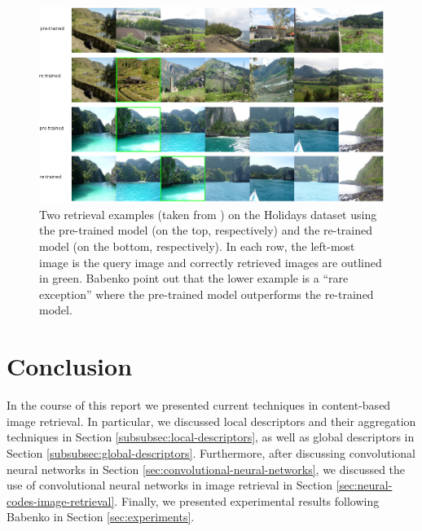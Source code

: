 \begin{figure}
    \centering
    \includegraphics[scale=0.4]{pictures/qualitative-annotated}
    \caption{Two retrieval examples (taken from \cite{BabenkoSlesarevChigorinLempitsky:2014}) on the Holidays dataset using the pre-trained model (on the top, respectively) and the re-trained model (on the bottom, respectively). In each row, the left-most image is the query image and correctly retrieved images are outlined in green. Babenko \etal point out that the lower example is a ``rare exception'' \cite[p. 10]{BabenkoSlesarevChigorinLempitsky:2014} where the pre-trained model outperforms the re-trained model.}
    \label{fig:qualitative}
\end{figure}

\section{Conclusion}
\label{sec:conclusion}

In the course of this report we presented current techniques in content-based image retrieval. In particular, we discussed local descriptors and their aggregation techniques in Section \ref{subsubsec:local-descriptors}, as well as global descriptors in Section \ref{subsubsec:global-descriptors}. Furthermore, after discussing convolutional neural networks in Section \ref{sec:convolutional-neural-networks}, we discussed the use of convolutional neural networks in image retrieval in Section \ref{sec:neural-codes-image-retrieval}. Finally, we presented experimental results following Babenko \etal \cite{BabenkoSlesarevChigorinLempitsky:2014} in Section \ref{sec:experiments}.

